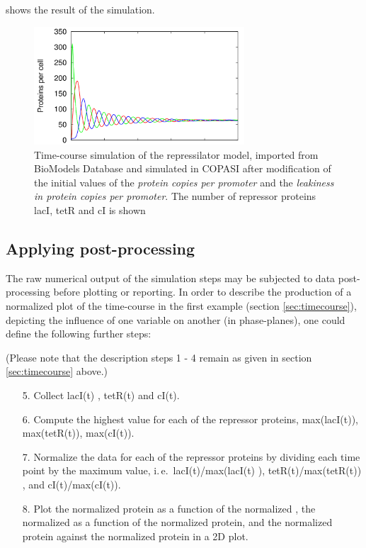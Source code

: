  shows the result of the simulation.

\begin{figure}[H]
\centering
\includegraphics[width=0.7\textwidth]{examples/rep_pre.png}
\caption{Time-course simulation of the repressilator model, imported from BioModels Database and simulated in COPASI after modification of the initial values of the \emph{protein copies per promoter} and the \emph{leakiness in protein copies per promoter}. The number of repressor proteins lacI, tetR and cI is shown}
\label{fig:rep_pre}
\end{figure}

\subsection{Applying post-processing}
\label{sec:postprocessing}
The raw numerical output of the simulation steps may be subjected to data post-processing before plotting or reporting.  In order to describe the production of a normalized plot of the time-course in the first example (section \ref{sec:timecourse}), depicting the influence of one variable on another (in phase-planes), one could define the following further steps:

(Please note that the description steps 1 - 4 remain as given in section \ref{sec:timecourse} above.)
\begin{enumerate}
\item[5.]{Collect lacI(t) , tetR(t) and cI(t).}
\item[6.]{Compute the highest value for each of the repressor proteins,  max(lacI(t)), max(tetR(t)), max(cI(t)).}
\item[7.]{Normalize the data for each of the repressor proteins by dividing each time point by the maximum value, i.\,e.\ lacI(t)/max(lacI(t) ), tetR(t)/max(tetR(t)) , and cI(t)/max(cI(t)).}
\item[8.]{Plot the normalized  protein as a function of the normalized , the normalized   as a function of the normalized  protein, and the normalized  protein against the normalized  protein in a 2D plot.}
\end{enumerate}

